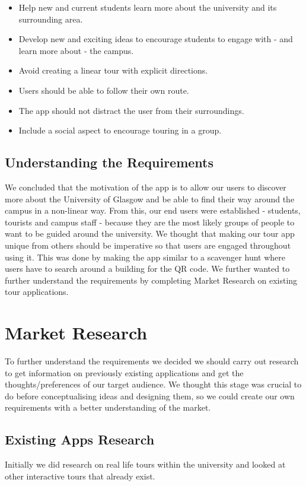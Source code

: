 \documentclass[a4,10pt,twocolumn]{article}
\begin{document}
\begin{itemize}
    \item Help new and current students learn more about the university and its surrounding area.
    \item Develop new and exciting ideas to encourage students to engage with - and learn more about - the campus.
    \item Avoid creating a linear tour with explicit directions.
    \item Users should be able to follow their own route.
    \item The app should not distract the user from their surroundings.
    \item Include a social aspect to encourage touring in a group.
\end{itemize}


\subsection{Understanding the Requirements}
We concluded that the motivation of the app is to allow our users to discover more about the University of Glasgow and be able to find their way around the campus in a non-linear way. From this, our end users were established - students, tourists and campus staff - because they are the most likely groups of people to want to be guided around the university. We thought that making our tour app unique from others should be imperative so that users are engaged throughout using it. This was done by making the app similar to a scavenger hunt where users have to search around a building for the QR code. We further wanted to further understand the requirements by completing Market Research on existing tour applications.

\section{Market Research}

To further understand the requirements we decided we should carry out research to get information on previously existing applications and get the thoughts/preferences of our target audience. We thought this stage was crucial to do before conceptualising ideas and designing them, so we could create our own requirements with a better understanding of the market.

\subsection{Existing Apps Research}
Initially we did research on real life tours within the university and looked at other interactive tours that already exist. 
\end{document}

